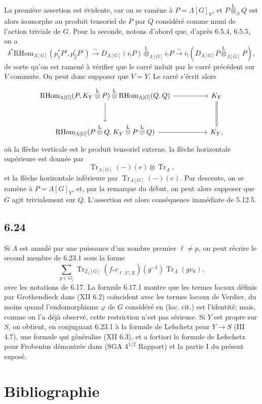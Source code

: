 \documentclass[11pt]{article}
\providecommand{\RHom}{\mathrm{RHom}}
\providecommand{\Tr}{\operatorname{Tr}}
\providecommand{\Tr}{\operatorname{Tr}}
\providecommand{\lten}{\overset{\mathrm L}{\otimes}}
\providecommand{\Tr}{\operatorname{Tr}}
\providecommand{\RHom}{\mathrm{RHom}}
\providecommand{\lten}{\overset{\mathrm L}{\otimes}}
\providecommand{\RHom}{\mathrm R\mathcal{H}om}
\providecommand{\lten}{\overset{\mathrm L}{\otimes}}
\providecommand{\Tr}{\operatorname{Tr}}
\providecommand{\lten}{\overset{\mathrm L}{\otimes}}
\providecommand{\lten}{\overset{\mathrm L}{\otimes}}
\providecommand{\lten}{\overset{\mathrm L}{\otimes}}
\providecommand{\RHom}{\mathrm{RHom}}
\providecommand{\Tr}{\operatorname{Tr}}
\providecommand{\lten}{\overset{\mathrm L}{\otimes}}
\begin{document}
La première assertion est évidente, car on se ramène à $P=\Lambda[G]_V$, et $P\lten_{\Lambda}Q$ est alors isomorphe au produit tensoriel de $P$ par $Q$ considéré comme muni de l'action triviale de $G$. Pour la seconde, notons d'abord que, d'après 6.5.4, 6.5.5, on a
\[
\delta^*\RHom_{\Lambda[G]}(p_1^*P',p_2^!P')
\xrightarrow{\sim}
D_{\Lambda[G]}(i_!P)\lten_{\Lambda[G]} i_!P
\xrightarrow{\sim}
i_!(D_{\Lambda[G]}P\lten_{\Lambda[G]}P),
\]
de sorte qu'on est ramené à vérifier que le carré induit par le carré précédent sur $V$ commute. On peut donc supposer que $V=Y$. Le carré s'écrit alors
\[
\begin{tikzcd}[column sep=huge,row sep=large]
\RHom_{\Lambda[G]}(P,K_Y\lten P)\lten\RHom_{\Lambda[G]}(Q,Q) \arrow[r] \arrow[d]
& K_Y \arrow[d,equal]\\
\RHom_{\Lambda[G]}(P\lten Q,K_Y\lten P\lten Q) \arrow[r]
& K_Y ,
\end{tikzcd}
\]
où la flèche verticale est le produit tensoriel externe, la flèche horizontale supérieure est donnée par
\[
\Tr_{\Lambda[G]}(-)(e)\otimes\Tr_{\Lambda},
\]
et la flèche horizontale inférieure par $\Tr_{\Lambda[G]}(-)(e)$. Par descente, on se ramène à $P=\Lambda[G]_Y$, et, par la remarque du début, on peut alors supposer que $G$ agit trivialement sur $Q$. L'assertion est alors conséquence immédiate de 5.12.5.

\subsection*{6.24}
Si $\Lambda$ est annulé par une puissance d'un nombre premier $\ell\ne p$, on peut récrire le second membre de 6.23.1 sous la forme
\[
\sum_{g\in G_{\natural}}
\Tr_{\mathbb Z_{\ell}[G]}(f_*\underline c_{\ell,U,X})(g^{-1})
\Tr_{\Lambda}(gv_0),
\]
avec les notations de 6.17. La formule 6.17.1 montre que les termes locaux définis par Grothendieck dans (XII 6.2) coïncident avec les termes locaux de Verdier, du moins quand l'endomorphisme $\varphi$ de $G$ considéré en (loc. cit.) est l'identité; mais, comme on l'a déjà observé, cette restriction n'est pas sérieuse. Si $Y$ est propre sur $S$, on obtient, en conjuguant 6.23.1 à la formule de Lefschetz pour $Y\to S$ (III 4.7), une formule qui généralise (XII 6.3), et a fortiori la formule de Lefschetz pour Frobenius démontrée dans (SGA $4^{1/2}$ Rapport) et la partie I du présent exposé.

\section*{Bibliographie}
\end{document}
